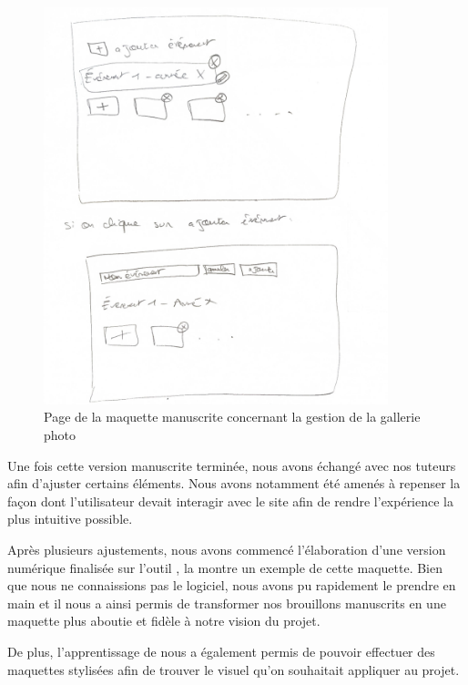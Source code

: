 \begin{figure}[H]
    \centering
    \includegraphics[width=10cm]{assets/pictures/maquette.png}
    \captionsetup{justification=centering}
    \caption{Page de la maquette manuscrite concernant la gestion de la gallerie photo}
    \label{manuscrite}%
\end{figure}
\bigskip

Une fois cette version manuscrite terminée, nous avons échangé avec nos tuteurs afin d’ajuster certains éléments.
Nous avons notamment été amenés à repenser la façon dont l'utilisateur devait interagir avec le site afin de rendre l'expérience la plus intuitive possible.

Après plusieurs ajustements, nous
avons commencé l'élaboration d'une version numérique finalisée sur l'outil , la  montre un exemple de cette maquette.
Bien que nous ne connaissions pas le logiciel, nous avons pu rapidement le prendre en main et il nous a ainsi permis de transformer nos brouillons manuscrits en une maquette plus aboutie et fidèle à notre vision du projet.

De plus, l'apprentissage de  nous a également permis de pouvoir effectuer des maquettes stylisées afin de trouver le visuel qu'on souhaitait appliquer au projet.
\bigskip

